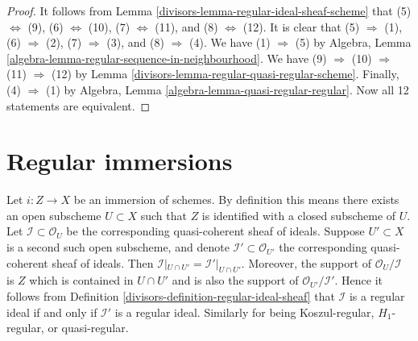 \begin{proof}

It follows from
Lemma \ref{divisors-lemma-regular-ideal-sheaf-scheme}
that (5) $\Leftrightarrow$ (9), (6) $\Leftrightarrow$ (10),
(7) $\Leftrightarrow$ (11), and (8) $\Leftrightarrow$ (12).
It is clear that (5) $\Rightarrow$ (1), (6) $\Rightarrow$ (2),
(7) $\Rightarrow$ (3), and (8) $\Rightarrow$ (4).
We have (1) $\Rightarrow$ (5) by
Algebra, Lemma \ref{algebra-lemma-regular-sequence-in-neighbourhood}.
We have (9) $\Rightarrow$ (10) $\Rightarrow$ (11) $\Rightarrow$ (12) by
Lemma \ref{divisors-lemma-regular-quasi-regular-scheme}.
Finally, (4) $\Rightarrow$ (1) by
Algebra, Lemma \ref{algebra-lemma-quasi-regular-regular}.
Now all 12 statements are equivalent.
\end{proof}

\section{Regular immersions}
\label{divisors-section-regular-immersions}
Let $i : Z \to X$ be an immersion of schemes. By definition this means
there exists an open subscheme $U \subset X$ such that
$Z$ is identified with a closed subscheme of $U$. Let
$\mathcal{I} \subset \mathcal{O}_U$ be the corresponding quasi-coherent
sheaf of ideals. Suppose $U' \subset X$ is a second such open
subscheme, and denote $\mathcal{I}' \subset \mathcal{O}_{U'}$
the corresponding quasi-coherent sheaf of ideals. Then
$\mathcal{I}|_{U \cap U'} = \mathcal{I}'|_{U \cap U'}$.
Moreover, the support of $\mathcal{O}_U/\mathcal{I}$
is $Z$ which is contained in $U \cap U'$ and is also the
support of $\mathcal{O}_{U'}/\mathcal{I}'$. Hence it follows from
Definition \ref{divisors-definition-regular-ideal-sheaf}
that $\mathcal{I}$ is a regular ideal if and only if
$\mathcal{I}'$ is a regular ideal. Similarly for being Koszul-regular,
$H_1$-regular, or quasi-regular.

